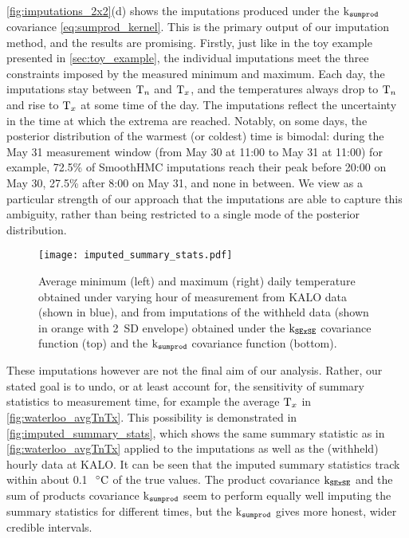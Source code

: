 \autoref{fig:imputations_2x2}(d) shows the imputations produced under the \(\operatorname{k_{\mathtt{sumprod}}}\) covariance \autoref{eq:sumprod_kernel}.
This is the primary output of our imputation method, and the results are promising.
Firstly, just like in the toy example presented in \autoref{sec:toy_example}, the individual imputations meet the three constraints imposed by the measured minimum and maximum.
Each day, the imputations stay between \(\mathrm{T}_{n}\) and \(\mathrm{T}_{x}\),
and the temperatures always drop to \(\mathrm{T}_{n}\) and rise to \(\mathrm{T}_{x}\) at some time of the day.
The imputations reflect the uncertainty in the time at which the extrema are reached.
Notably, on some days, the posterior distribution of the warmest (or coldest) time is bimodal:
during the May 31 measurement window (from May 30 at 11:00 to May 31 at 11:00) for example, 72.5\% of SmoothHMC imputations reach their peak before 20:00 on May 30, 27.5\% after 8:00 on May 31, and none in between. 
We view as a particular strength of our approach that the imputations are able to capture this ambiguity, rather than being restricted to a single mode of the posterior distribution.

\begin{figure}[tbp]
\centering
\texttt{[image: imputed\_summary\_stats.pdf]}
\caption{\label{fig:imputed_summary_stats}
Average minimum (left) and maximum (right) daily temperature obtained under varying hour of measurement from KALO data (shown in blue), and from imputations of the withheld data (shown in orange with 2~SD envelope) obtained under the \(\operatorname{k_{\mathtt{SExSE}}}\) covariance function (top) and the \(\operatorname{k_{\mathtt{sumprod}}}\) covariance function (bottom).}
\end{figure}


These imputations however are not the final aim of our analysis.
Rather, our stated goal is to undo, or at least account for, the sensitivity of summary statistics to measurement time, for example the average \(\mathrm{T}_{x}\) in \autoref{fig:waterloo_avgTnTx}.
This possibility is demonstrated in \autoref{fig:imputed_summary_stats},
which shows the same summary statistic as in \autoref{fig:waterloo_avgTnTx} applied to the imputations as well as the (withheld) hourly data at KALO.
It can be seen that the imputed summary statistics track within about 0.1~\({\,^\circ}{}\mathrm{C}\) of the true values.
The product covariance \(\operatorname{k_{\mathtt{SExSE}}}\) and the sum of products covariance \(\operatorname{k_{\mathtt{sumprod}}}\) seem to perform equally well imputing the summary statistics for different times, but the \(\operatorname{k_{\mathtt{sumprod}}}\) gives more honest, wider credible intervals.


